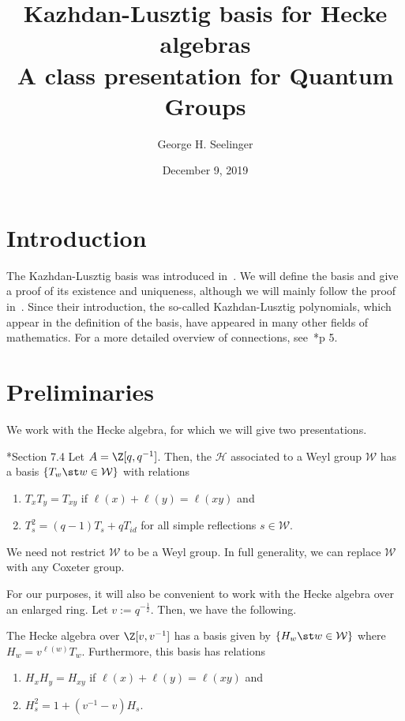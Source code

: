 \documentclass[11pt,leqno,oneside]{amsart}
\title[Kazhdan-Lusztig Basis]{Kazhdan-Lusztig basis for Hecke algebras
  \\ A class presentation for Quantum Groups}
\author{George H. Seelinger}
\date{December 9, 2019}
\numberwithin{thm}{section}
\renewcommand{\W}{\mathcal{W}}
\renewcommand{\H}{\mathcal{H}} %
\begin{document}
\maketitle
\section{Introduction}
The Kazhdan-Lusztig basis was introduced in~\cite{kl}. We will define
the basis and give 
a proof of its existence and uniqueness, although we will mainly
follow the proof in~\cite{soergel}. Since their introduction, the
so-called Kazhdan-Lusztig polynomials, which appear in the definition
of the basis, have appeared in many other fields of mathematics. For a
more detailed overview of connections, see~\cite{brenti}*{p 5}.
\section{Preliminaries}
We work with the Hecke algebra, for which we will give two
presentations.
\begin{defn}
  \cite{humphreys}*{Section 7.4} Let \(A = \Z[q,q^{-1}]\). Then, the
   \(\H\) associated to 
  a Weyl group \(\W\) has a basis \(\{T_w \st w \in \W\}\) with
  relations
  \begin{enumerate}
  \item \(T_x T_y = T_{xy}\) if \(\ell(x) + \ell(y) = \ell(xy)\) and
  \item \(T_s^2 = (q-1)T_s + qT_{id}\) for all simple reflections \(s
    \in \W\).
  \end{enumerate}
\end{defn}
\begin{rmk}
  We need not restrict \(\W\) to be a Weyl group. In full generality,
  we can replace \(\W\) with any Coxeter group.
\end{rmk}
For our purposes, it will also be convenient to work with the Hecke
algebra over an enlarged ring. Let \(v := q^{-\frac{1}{2}}\). Then, we
have the following.
\begin{prop}\label{H-basis}
  The Hecke algebra over \(\Z[v,v^{-1}]\) has a basis given by \(\{H_w
  \st w \in \W\}\) where \(H_w = v^{\ell(w)} T_w\). Furthermore, this
  basis has relations
  \begin{enumerate}
  \item \(H_x H_y = H_{xy}\) if \(\ell(x)+\ell(y) = \ell(xy)\) and
  \item \(H_s^2 = 1 + (v^{-1}-v)H_s\). 
  \end{enumerate}
\end{prop}
\end{document}

